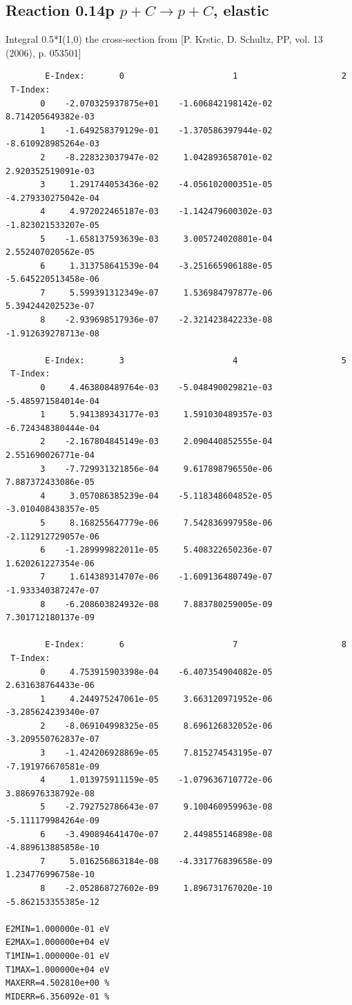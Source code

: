 \documentclass[12pt,dvipdfmx]{article}
\begin{document}
\subsection{
Reaction 0.14p  $p + C \rightarrow p + C$, elastic}

Integral 0.5*I(1,0) the cross-section from [P. Krstic, D. Schultz, PP, vol. 13 (2006), p. 053501]

\begin{small}\begin{verbatim}
        E-Index:       0                      1                     2
 T-Index:
       0    -2.070325937875e+01    -1.606842198142e-02     8.714205649382e-03
       1    -1.649258379129e-01    -1.370586397944e-02    -8.610928985264e-03
       2    -8.228323037947e-02     1.042893658701e-02     2.920352519091e-03
       3     1.291744053436e-02    -4.056102000351e-05    -4.279330275042e-04
       4     4.972022465187e-03    -1.142479600302e-03    -1.823021533207e-05
       5    -1.658137593639e-03     3.005724020801e-04     2.552407020562e-05
       6     1.313758641539e-04    -3.251665906188e-05    -5.645220513458e-06
       7     5.599391312349e-07     1.536984797877e-06     5.394244202523e-07
       8    -2.939698517936e-07    -2.321423842233e-08    -1.912639278713e-08

        E-Index:       3                      4                     5
 T-Index:
       0     4.463808489764e-03    -5.048490029821e-03    -5.485971584014e-04
       1     5.941389343177e-03     1.591030489357e-03    -6.724348380444e-04
       2    -2.167804845149e-03     2.090440852555e-04     2.551690026771e-04
       3    -7.729931321856e-04     9.617898796550e-06     7.887372433086e-05
       4     3.057086385239e-04    -5.118348604852e-05    -3.010408438357e-05
       5     8.168255647779e-06     7.542836997958e-06    -2.112912729057e-06
       6    -1.289999822011e-05     5.408322650236e-07     1.620261227354e-06
       7     1.614389314707e-06    -1.609136480749e-07    -1.933340387247e-07
       8    -6.208603824932e-08     7.883780259005e-09     7.301712180137e-09

        E-Index:       6                      7                     8
 T-Index:
       0     4.753915903398e-04    -6.407354904082e-05     2.631638764433e-06
       1     4.244975247061e-05     3.663120971952e-06    -3.285624239340e-07
       2    -8.069104998325e-05     8.696126832052e-06    -3.209550762837e-07
       3    -1.424206928869e-05     7.815274543195e-07    -7.191976670581e-09
       4     1.013975911159e-05    -1.079636710772e-06     3.886976338792e-08
       5    -2.792752786643e-07     9.100460959963e-08    -5.111179984264e-09
       6    -3.490894641470e-07     2.449855146898e-08    -4.889613885858e-10
       7     5.016256863184e-08    -4.331776839658e-09     1.234776996758e-10
       8    -2.052868727602e-09     1.896731767020e-10    -5.862153355385e-12

E2MIN=1.000000e-01 eV
E2MAX=1.000000e+04 eV
T1MIN=1.000000e-01 eV
T1MAX=1.000000e+04 eV
MAXERR=4.502810e+00 %
MIDERR=6.356092e-01 %
\end{verbatim}\end{small}
\newpage
\end{document}
